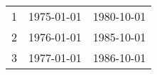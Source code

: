 % 
\begin{tabular}{ccc}
  \hline
  \hline
1 & 1975-01-01 & 1980-10-01 \\ 
  2 & 1976-01-01 & 1985-10-01 \\ 
  3 & 1977-01-01 & 1986-10-01 \\ 
   \hline
\end{tabular}
